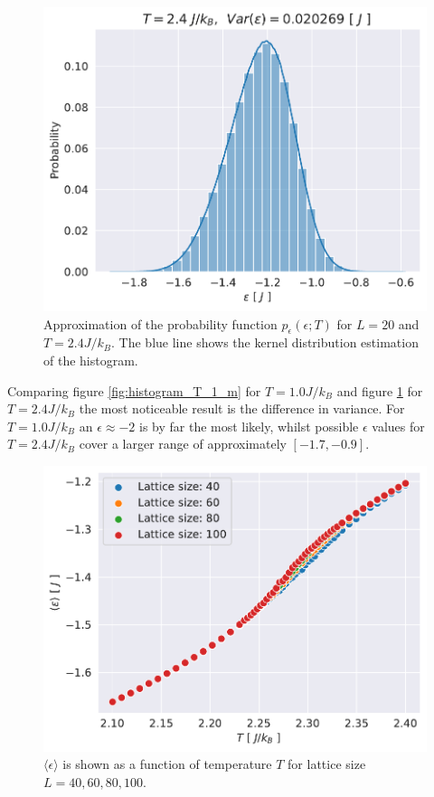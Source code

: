 \documentclass[english,notitlepage,reprint,nofootinbib]{revtex4-1}  %
\begin{document}
\begin{figure}[H]
    \centering
    \includegraphics[width=.5\textwidth]{../figures/histogram_T_2_4_m.pdf}
    \caption{Approximation of the probability function $p_{\epsilon}(\epsilon ; T)$ for $L=20$ and $T=2.4 J/k_B$. The blue line shows the kernel distribution estimation of the histogram.}
    \label{fig:histogram_T_2_4_m}
\end{figure}
Comparing figure \ref{fig:histogram_T_1_m} for $T=1.0 J/k_B$ and figure \ref{fig:histogram_T_2_4_m} for $T=2.4 J/k_B$ the most noticeable result is the difference in variance. For $T=1.0 J/k_B$ an $\epsilon \approx -2$ is by far the most likely, whilst possible $\epsilon$ values for $T=2.4 J/k_B$ cover a larger range of approximately $[-1.7,-0.9]$.

\begin{figure}[H]
    \centering
    \includegraphics[width=.5\textwidth]{../figures/L_size_e_T.pdf}
    \caption{$\langle \epsilon \rangle$ is shown as a function of temperature $T$ for lattice size $L= 40, 60,80,100$.}
    \label{fig:L_size_e_T}
\end{figure}
\end{document}
